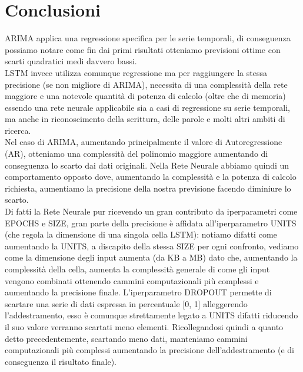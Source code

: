 \documentclass[a4paper,12pt]{article}
\begin{document}
    \section{Conclusioni}ARIMA applica una regressione specifica per le serie 
    temporali, di conseguenza possiamo notare come fin dai primi risultati 
    otteniamo previsioni ottime con scarti quadratici medi davvero bassi.\\
    LSTM invece utilizza comunque regressione ma per raggiungere la stessa 
    precisione (se non migliore di ARIMA), necessita di una complessità della 
    rete maggiore e una notevole quantità di potenza di calcolo (oltre che di 
    memoria) essendo una rete neurale applicabile sia a casi di regressione su 
    serie temporali, ma anche in riconoscimento della scrittura, delle parole e
    molti altri ambiti di ricerca.\\
    Nel caso di ARIMA, aumentando principalmente il valore di Autoregressione 
    (AR), otteniamo una complessità del polinomio maggiore aumentando di
    conseguenza lo scarto dai dati originali. Nella Rete Neurale abbiamo quindi
    un comportamento opposto dove, aumentando la complessità e la potenza di 
    calcolo richiesta, aumentiamo la precisione della nostra previsione 
    facendo diminiure lo scarto.\\
    Di fatti la Rete Neurale pur ricevendo un gran contributo da iperparametri
    come EPOCHS e SIZE, gran parte della precisione è affidata 
    all'iperparametro UNITS (che regola la dimensione di una singola cella 
    LSTM): notiamo difatti come aumentando la UNITS, a discapito della stessa
    SIZE per ogni confronto, vediamo come la dimensione degli input aumenta
    (da KB a MB) dato che, aumentando la complessità della cella, aumenta la
    complessità generale di come gli input vengono combinati ottenendo
    cammini computazionali più complessi e aumentando la precisione finale.
    L'iperparametro DROPOUT permette di scartare una serie di dati espressa in
    percentuale [0, 1] alleggerendo l'addestramento, esso è comunque 
    strettamente legato a UNITS difatti riducendo il suo valore verranno 
    scartati meno elementi. Ricollegandosi quindi a quanto detto 
    precedentemente, scartando meno dati, manteniamo cammini computazionali più
    complessi aumentando la precisione dell'addestramento (e di conseguenza
    il risultato finale).
\end{document}
